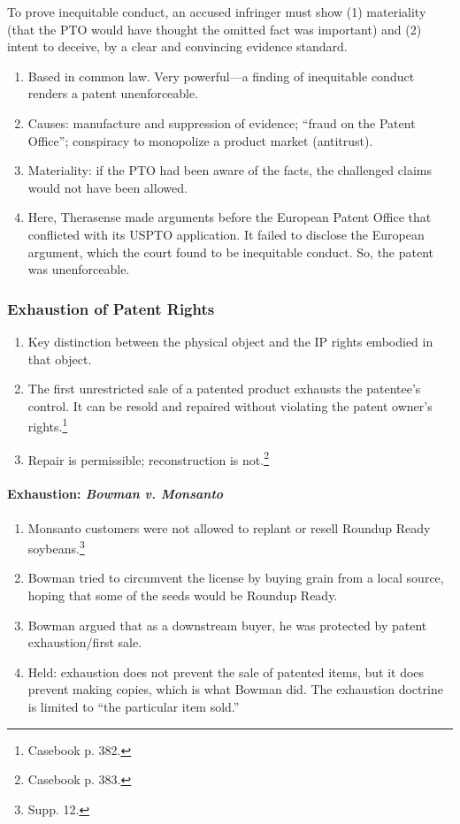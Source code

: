 To prove inequitable conduct, an accused infringer must show (1) materiality 
(that the PTO would have thought the omitted fact was important) and (2) 
intent to deceive, by a clear and convincing evidence standard.

\begin{enumerate}
    \item Based in common law. Very powerful---a finding of inequitable 
    conduct renders a patent unenforceable.
    \item Causes: manufacture and suppression of evidence; ``fraud on the 
    Patent Office''; conspiracy to monopolize a product market (antitrust).
    \item Materiality: if the PTO had been aware of the facts, the challenged 
    claims would not have been allowed.
    \item Here, Therasense made arguments before the European Patent Office 
    that conflicted with its USPTO application. It failed to disclose the 
    European argument, which the court found to be inequitable conduct. So, 
    the patent was unenforceable.
\end{enumerate}

\subsubsection{Exhaustion of Patent Rights} %

\begin{enumerate}
    \item Key distinction between the physical object and the IP rights 
    embodied in that object.
    \item The first unrestricted sale of a patented product exhausts the 
    patentee's control. It can be resold and repaired without violating the 
    patent owner's rights.\footnote{Casebook p. 382.}
    \item Repair is permissible; reconstruction is not.\footnote{Casebook p. 
    383.}
\end{enumerate}

\paragraph{Exhaustion: \emph{Bowman v. Monsanto}}

\begin{enumerate}
    \item Monsanto customers were not allowed to replant or resell Roundup 
    Ready soybeans.\footnote{Supp. 12.}
    \item Bowman tried to circumvent the license by buying grain from a local 
    source, hoping that some of the seeds would be Roundup Ready.
    \item Bowman argued that as a downstream buyer, he was protected by patent 
    exhaustion/first sale.
    \item Held: exhaustion does not prevent the sale of patented items, but it 
    does prevent making copies, which is what Bowman did. The exhaustion 
    doctrine is limited to ``the particular item sold.''
\end{enumerate}

